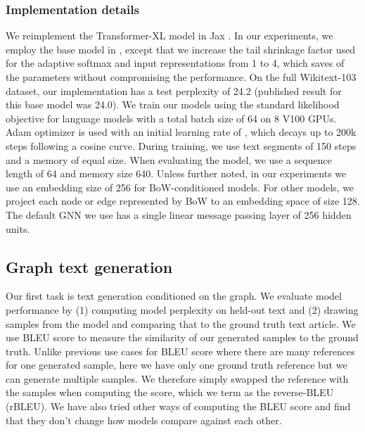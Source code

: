 \documentclass[11pt]{article}
\begin{document}
\subsubsection{Implementation details}
We reimplement the Transformer-XL model in Jax \cite{jax2018github}. In our experiments, we employ the base model in \cite{dai2019transformer}, except that we increase the tail shrinkage factor used for the adaptive softmax and input representations from 1 to 4, which saves  of the parameters without compromising the performance. On the full Wikitext-103 dataset, our implementation has a test perplexity of 24.2 (published result for this base model was 24.0). We train our models using the standard likelihood objective for language models with a total batch size of 64 on 8 V100 GPUs. Adam optimizer is used with an initial learning rate of , which decays up to 200k steps following a cosine curve. During training, we use text segments of 150 steps and a memory of equal size. When evaluating the model, we use a sequence length of 64 and memory size 640. Unless further noted, in our experiments we use an embedding size of 256 for BoW-conditioned models. For other models, we project each node or edge represented by BoW to an embedding space of size 128. The default GNN we use has a single linear message passing layer of 256 hidden units.





\subsection{Graph  text generation}\label{sec:graph2text}



Our first task is text generation conditioned on the graph.  We evaluate model performance by (1) computing model perplexity on held-out text and (2) drawing samples from the model and comparing that to the ground truth text article.  We use BLEU score \cite{papineni2002bleu} to measure the similarity of our generated samples to the ground truth.  Unlike previous use cases for BLEU score where there are many references for one generated sample, here we have only one ground truth reference but we can generate multiple samples.  We therefore simply swapped the reference with the samples when computing the score, which we term as the reverse-BLEU (rBLEU).  We have also tried other ways of computing the BLEU score and find that they don't change how models compare against each other.
\end{document}
